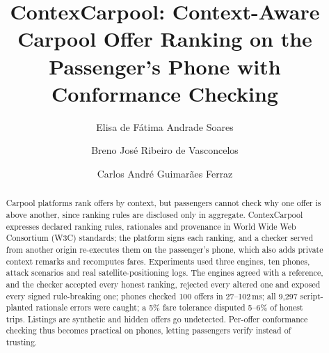 \documentclass{svproc}
\begin{document}
\mainmatter

\title{ContexCarpool: Context-Aware Carpool Offer Ranking on the Passenger's Phone with Conformance Checking}

\newif\ifanon
\anonfalse
\ifanon
\author{Anonymous Author(s)}
\authorrunning{Anonymous et al.}
\tocauthor{Anonymous Author(s)}
\institute{Affiliation removed for review}
\else
\author{Elisa de F\'atima Andrade Soares \and Breno Jos\'e Ribeiro de Vasconcelos \and
Carlos Andr\'e Guimar\~aes Ferraz}
\fi

\maketitle

\begin{abstract}
Carpool platforms rank offers by context, but passengers cannot check why one offer is above another, since ranking rules are disclosed only in aggregate. ContexCarpool expresses declared ranking rules, rationales and provenance in World Wide Web Consortium (W3C) standards; the platform signs each ranking, and a checker served from another origin re-executes them on the passenger's phone, which also adds private context remarks and recomputes fares. Experiments used three engines, ten phones, attack scenarios and real satellite-positioning logs. The engines agreed with a reference, and the checker accepted every honest ranking, rejected every altered one and exposed every signed rule-breaking one; phones checked 100 offers in 27--102\,ms; all 9,297 script-planted rationale errors were caught; a 5\% fare tolerance disputed 5--6\% of honest trips. Listings are synthetic and hidden offers go undetected. Per-offer conformance checking thus becomes practical on phones, letting passengers verify instead of trusting.
\end{abstract}
\end{document}
